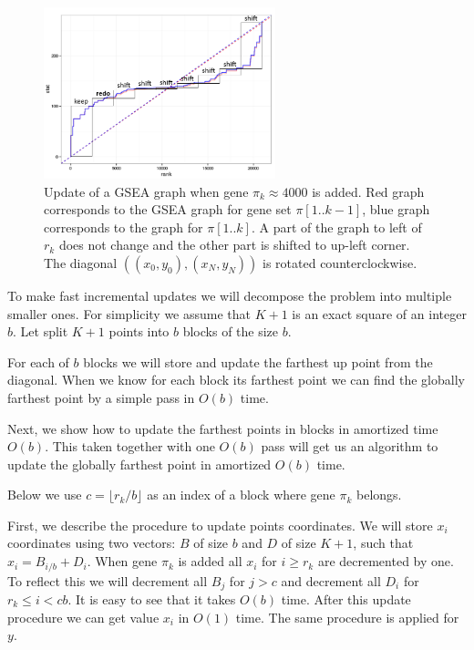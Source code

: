 \documentclass[runningheads,a4paper]{llncs}
\begin{document}
\begin{figure}[h]
\begin{center}
\includegraphics[width=0.6\textwidth]{gsea_update.png}
\end{center}
\caption{
    Update of a GSEA graph when gene $\pi_k \approx 4000$ is 
    added. Red graph corresponds
    to the GSEA graph for gene set $\pi[1..k-1]$, 
    blue graph corresponds to the 
    graph for $\pi[1..k]$.
    A part of the graph to left of $r_k$ does not change and 
    the other part is shifted to up-left corner. The diagonal
    $\left((x_0, y_0), (x_N, y_N)\right)$ is rotated
    counterclockwise.
  }\label{fig_gsea_update}
\end{figure}

To make fast incremental updates we will decompose the problem into
multiple smaller ones. For simplicity we assume that $K+1$ is an exact
square of an integer $b$. Let split $K+1$ points into $b$ blocks of 
the size $b$.

For each of $b$ blocks we will store and update the farthest up point
from the diagonal. When we know for each block its farthest point
we can find the globally farthest point by a simple pass in $O(b)$ time.

Next, we show how to update the farthest points in blocks in amortized time
$O(b)$. This taken together with one $O(b)$ pass will get us an algorithm
to update the globally farthest point in amortized $O(b)$ time.

Below we use $c = \lfloor r_k / b \rfloor$ as an index of a block where gene
$\pi_k$ belongs.

First, we describe the procedure to update points coordinates. 
We will store $x_i$ coordinates using two vectors: $B$ of size $b$
and $D$ of size $K + 1$, such that $x_i = B_{i / b} + D_i$.
When gene $\pi_k$ is added all $x_i$ for $i \ge r_k$ are decremented by one.
To reflect this we will decrement all $B_j$ for $j > c$ and decrement
all $D_i$ for $r_k \le i < cb$. It is easy to see that it takes $O(b)$ 
time. After this update procedure we can get value $x_i$ in $O(1)$ time.
The same procedure is applied for $y$.
\end{document}
